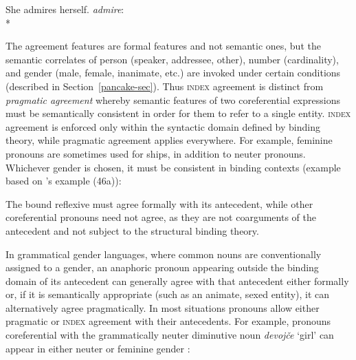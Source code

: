 \documentclass[output=paper
 	        ,biblatex
                ,babelshorthands
                ,newtxmath
                ,draftmode
                ,colorlinks, citecolor=brown
]{langscibook}
\begin{document}
\begin{exe}
\ex  
 \begin{xlist}  \label{admire}
\ex She admires herself.  
\ex \textit{admire}:\\*
\end{xlist}
\end{exe}

\noindent
The agreement features are formal features and not semantic ones, but the semantic correlates of person (speaker, addressee, other), number (cardinality), and gender (male, female, inanimate, etc.) are invoked under certain conditions (described in Section~\ref{pancake-sec}).   
Thus \textsc{index} agreement is distinct from \textit{pragmatic agreement} whereby semantic features of two
coreferential expressions must be semantically consistent in order for them to refer to a single
entity.  \textsc{index} agreement is enforced only within the  syntactic domain defined by binding theory,
while pragmatic agreement applies everywhere.   For example, feminine pronouns are sometimes used
for ships, in addition to neuter pronouns.  Whichever gender is chosen, it must be consistent in
binding contexts (example based on \citeauthor{Pollard+Sag:1994}'s \citeyear[79]{Pollard+Sag:1994} example (46a)):


\begin{exe}
\ex   \label{lurch}
\begin{xlist}
\end{xlist}
\end{exe}

\noindent
The bound reflexive must agree formally with its antecedent, while other
coreferential pronouns need not agree, as they are not coarguments of the antecedent and not subject to the structural binding theory.  

In grammatical gender languages, where common nouns are conventionally assigned to a gender, an anaphoric pronoun appearing outside the binding domain of its antecedent can generally agree with that antecedent either formally or, if it is semantically appropriate (such as an animate, sexed entity), it can alternatively agree pragmatically.  In most situations pronouns allow either pragmatic or \textsc{index} agreement with their
antecedents.  For example, pronouns coreferential with the  grammatically neuter diminutive noun \textit{devoj\v{c}e} `girl' can appear in either neuter or feminine gender \citep[from][198]{Wechsler+Zlatic:2003}:
\end{document}
